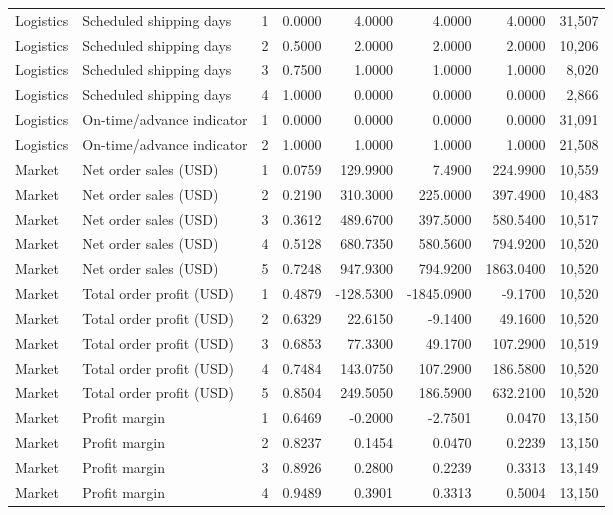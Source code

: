 \begin{longtable}{@{}llrrrrrr@{}}
Logistics & Scheduled shipping days & 1 & 0.0000 & 4.0000 & 4.0000 & 4.0000 & 31,507\\
Logistics & Scheduled shipping days & 2 & 0.5000 & 2.0000 & 2.0000 & 2.0000 & 10,206\\
Logistics & Scheduled shipping days & 3 & 0.7500 & 1.0000 & 1.0000 & 1.0000 & 8,020\\
Logistics & Scheduled shipping days & 4 & 1.0000 & 0.0000 & 0.0000 & 0.0000 & 2,866\\
Logistics & On-time/advance indicator & 1 & 0.0000 & 0.0000 & 0.0000 & 0.0000 & 31,091\\
Logistics & On-time/advance indicator & 2 & 1.0000 & 1.0000 & 1.0000 & 1.0000 & 21,508\\
Market & Net order sales (USD) & 1 & 0.0759 & 129.9900 & 7.4900 & 224.9900 & 10,559\\
Market & Net order sales (USD) & 2 & 0.2190 & 310.3000 & 225.0000 & 397.4900 & 10,483\\
Market & Net order sales (USD) & 3 & 0.3612 & 489.6700 & 397.5000 & 580.5400 & 10,517\\
Market & Net order sales (USD) & 4 & 0.5128 & 680.7350 & 580.5600 & 794.9200 & 10,520\\
Market & Net order sales (USD) & 5 & 0.7248 & 947.9300 & 794.9200 & 1863.0400 & 10,520\\
Market & Total order profit (USD) & 1 & 0.4879 & -128.5300 & -1845.0900 & -9.1700 & 10,520\\
Market & Total order profit (USD) & 2 & 0.6329 & 22.6150 & -9.1400 & 49.1600 & 10,520\\
Market & Total order profit (USD) & 3 & 0.6853 & 77.3300 & 49.1700 & 107.2900 & 10,519\\
Market & Total order profit (USD) & 4 & 0.7484 & 143.0750 & 107.2900 & 186.5800 & 10,520\\
Market & Total order profit (USD) & 5 & 0.8504 & 249.5050 & 186.5900 & 632.2100 & 10,520\\
Market & Profit margin & 1 & 0.6469 & -0.2000 & -2.7501 & 0.0470 & 13,150\\
Market & Profit margin & 2 & 0.8237 & 0.1454 & 0.0470 & 0.2239 & 13,150\\
Market & Profit margin & 3 & 0.8926 & 0.2800 & 0.2239 & 0.3313 & 13,149\\
Market & Profit margin & 4 & 0.9489 & 0.3901 & 0.3313 & 0.5004 & 13,150\\
\bottomrule
\end{longtable}
\endgroup
